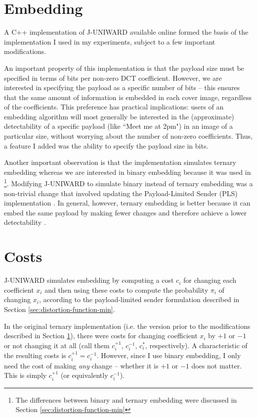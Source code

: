 \documentclass[11pt,a4paper,twoside,openright]{report}
\begin{document}
\section{Embedding} \label{sec:juniward-impl}

A C++ implementation of J-UNIWARD available online \cite{binghamton-embedding} formed the basis of the implementation I used in my experiments, subject to a few important modifications.

An important property of this implementation is that the payload size must be specified in terms of bits per non-zero DCT coefficient. However, we are interested in specifying the payload as a specific number of bits -- this ensures that the same amount of information is embedded in each cover image, regardless of the coefficients. This preference has practical implications: users of an embedding algorithm will most generally be interested in the (approximate) detectability of a specific payload (like ``Meet me at 2pm") in an image of a particular size, without worrying about the number of non-zero coefficients. Thus, a feature I added was the ability to specify the payload size in bits.

Another important observation is that the implementation simulates ternary embedding whereas we are interested in binary embedding because it was used in \cite{2008-paper}\footnote{The differences between binary and ternary embedding were discussed in Section \ref{sec:distortion-function-min}}. Modifying J-UNIWARD to simulate binary instead of ternary embedding was a non-trivial change that involved updating the Payload-Limited Sender (PLS) implementation \cite{non-binary-embedding}. In general, however, ternary embedding is better because it can embed the same payload by making fewer changes and therefore achieve a lower detectability \cite{non-binary-embedding}.


\section{Costs} \label{sec:costs}

J-UNIWARD simulates embedding by computing a cost $c_i$ for changing each coefficient $x_i$ and then using these costs to compute the probability $\pi_i$ of changing $x_i$, according to the payload-limited sender formulation described in Section \ref{sec:distortion-function-min}.

In the original ternary implementation (i.e. the version prior to the modifications described in Section \ref{sec:juniward-impl}), there were costs for changing coefficient $x_i$ by $+1$ or $-1$ or not changing it at all (call them $c_i^{+1}$, $c_i^{-1}$, $c_i^{\ast}$, respectively). A characteristic of the resulting costs is $c_i^{+1} = c_i^{-1}$. However, since I use binary embedding, I only need the cost of making \textit{any} change -- whether it is $+1$ or $-1$ does not matter. This is simply $c_i^{+1}$ (or equivalently $c_i^{-1}$).
\end{document}
